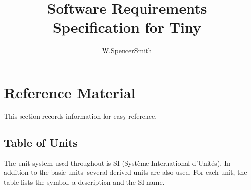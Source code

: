\documentclass[12pt]{article}
\title{Software Requirements Specification for Tiny}
\author{W.SpencerSmith}
\begin{document}
\maketitle
\tableofcontents
\newpage
\section{Reference Material}
\label{Sec:RefMat}
This section records information for easy reference.
\subsection{Table of Units}
\label{Sec:ToU}
The unit system used throughout is SI (Système International d'Unités). In addition to the basic units, several derived units are also used. For each unit, the table lists the symbol, a description and the SI name.
\end{document}
